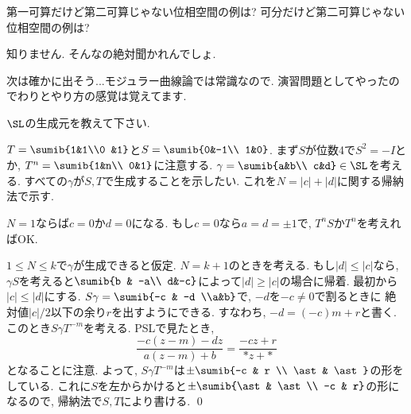 \begin{prob}
第一可算だけど第二可算じゃない位相空間の例は? 可分だけど第二可算じゃない位相空間の例は? 
\end{prob}

\begin{ans}
知りません. そんなの絶対聞かれんでしょ. 
\end{ans}
次は確かに出そう...モジュラー曲線論では常識なので. 演習問題としてやったのでわりとやり方の感覚は覚えてます. 
\begin{prob}
$\SL$の生成元を教えて下さい.
\end{prob}
\begin{ans}
$T = \sumib{1&1\\0 &1}$と$S = \sumib{0&-1\\ 1&0}$. まず$S$が位数4で$S^{2} = -I$とか, $T^n = \sumib{1&n\\ 0&1}$に注意する. $\gamma = \sumib{a&b\\ c&d}\in \SL$を考える. すべての$\gamma$が$S,T$で生成することを示したい. これを$N = |c|+|d|$に関する帰納法で示す. \par 
$N=1$ならば$c=0$か$d=0$になる. もし$c=0$なら$a=d= \pm 1$で, $T^n S$か$T^n$を考えればOK. \par 
$1\leq N\leq k$で$\gamma$が生成できると仮定. $N = k+1$のときを考える. もし$|d| \leq |c|$なら, $\gamma S$を考えると$\sumib{b & -a\\ d&-c}$によって$|d|\geq |c|$の場合に帰着. 最初から$|c|\leq |d|$にする. $S \gamma = \sumib{-c & -d \\a&b}$で, $-d$を$-c\neq 0$で割るときに 絶対値$|c|/2$以下の余り$r$を出すようにできる. すなわち, $-d = (-c)m + r$と書く. このとき$S\gamma T^{-m}$を考える. PSLで見たとき, 
\[\dfrac{-c(z-m) - dz}{a(z-m) + b} = \dfrac{-cz + r}{\ast z + \ast} \]
となることに注意. よって, $S\gamma T^{-m}$は$\pm \sumib{-c & r \\ \ast & \ast}$の形をしている. これに$S$を左からかけると$\pm \sumib{\ast & \ast \\ -c & r}$の形になるので, 帰納法で$S,T$により書ける. \qed 
\end{ans}

